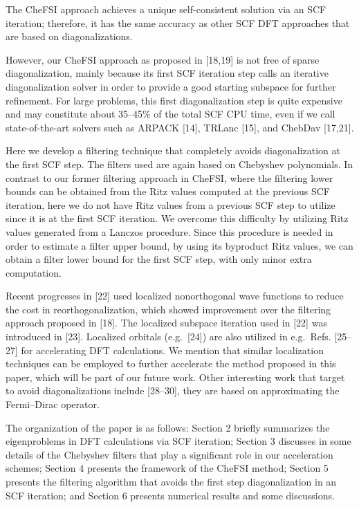 \documentclass[
  10
]{article}
\begin{document}
The CheFSI approach achieves a unique self-consistent solution via an
SCF iteration; therefore, it has the same accuracy as other SCF DFT
approaches that are based on diagonalizations.

However, our CheFSI approach as proposed in {[}18,19{]} is not free of
sparse diagonalization, mainly because its first SCF iteration step
calls an iterative diagonalization solver in order to provide a good
starting subspace for further refinement. For large problems, this first
diagonalization step is quite expensive and may constitute about
35--45\% of the total SCF CPU time, even if we call state-of-the-art
solvers such as ARPACK {[}14{]}, TRLanc {[}15{]}, and ChebDav
{[}17,21{]}.

Here we develop a filtering technique that completely avoids
diagonalization at the first SCF step. The filters used are again based
on Chebyshev polynomials. In contrast to our former filtering approach
in CheFSI, where the filtering lower bounds can be obtained from the
Ritz values computed at the previous SCF iteration, here we do not have
Ritz values from a previous SCF step to utilize since it is at the first
SCF iteration. We overcome this difficulty by utilizing Ritz values
generated from a Lanczos procedure. Since this procedure is needed in
order to estimate a filter upper bound, by using its byproduct Ritz
values, we can obtain a filter lower bound for the first SCF step, with
only minor extra computation.

Recent progresses in {[}22{]} used localized nonorthogonal wave
functions to reduce the cost in reorthogonalization, which showed
improvement over the filtering approach proposed in {[}18{]}. The
localized subspace iteration used in {[}22{]} was introduced in
{[}23{]}. Localized orbitals (e.g.~{[}24{]}) are also utilized in
e.g.~Refs. {[}25--27{]} for accelerating DFT calculations. We mention
that similar localization techniques can be employed to further
accelerate the method proposed in this paper, which will be part of our
future work. Other interesting work that target to avoid
diagonalizations include {[}28--30{]}, they are based on approximating
the Fermi--Dirac operator.

The organization of the paper is as follows: Section 2 briefly
summarizes the eigenproblems in DFT calculations via SCF iteration;
Section 3 discusses in some details of the Chebyshev filters that play a
significant role in our acceleration schemes; Section 4 presents the
framework of the CheFSI method; Section 5 presents the filtering
algorithm that avoids the first step diagonalization in an SCF
iteration; and Section 6 presents numerical results and some
discussions.
\end{document}

